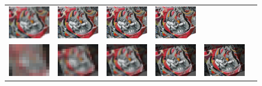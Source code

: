 \begin{figure}
\begin{center}
\begin{tabular}{c c c c c c}
        \includegraphics[width=1.8cm]{main/chapter03/data/homography/img_dst_3.jpg} &
        \includegraphics[width=1.8cm]{main/chapter03/data/homography/img_dst_4.jpg} &
        \includegraphics[width=1.8cm]{main/chapter03/data/homography/img_dst_5.jpg} &
        \includegraphics[width=1.8cm]{main/chapter03/data/homography/img_dst_7.jpg} \\
        \includegraphics[width=1.8cm]{main/chapter03/data/homography/img_src_to_dst_1.jpg} &
        \includegraphics[width=1.8cm]{main/chapter03/data/homography/img_src_to_dst_2.jpg} &
        \includegraphics[width=1.8cm]{main/chapter03/data/homography/img_src_to_dst_3.jpg} &
        \includegraphics[width=1.8cm]{main/chapter03/data/homography/img_src_to_dst_4.jpg} &
        \includegraphics[width=1.8cm]{main/chapter03/data/homography/img_src_to_dst_5.jpg} &

\end{tabular}
\end{center}
\end{figure}
